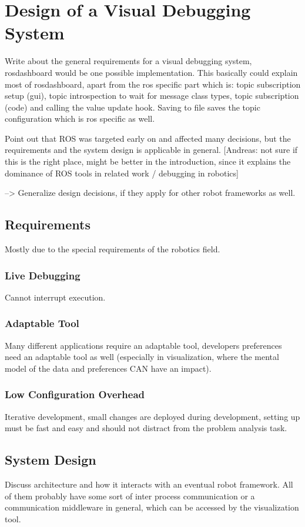 \chapter{Design of a Visual Debugging System}
\label{visual_debugging_system}

Write about the general requirements for a visual debugging system, rosdashboard would be one possible implementation. This basically could explain most of rosdashboard, apart from the ros specific part which is: topic subscription setup (gui), topic introspection to wait for message class types, topic subscription (code) and calling the value update hook. Saving to file saves the topic configuration which is ros specific as well.

Point out that ROS was targeted early on and affected many decisions, but the requirements and the system design is applicable in general. [Andreas: not sure if this is the right place, might be better in the introduction, since it explains the dominance of ROS tools in related work / debugging in robotics]

--> Generalize design decisions, if they apply for other robot frameworks as well.

\section{Requirements}
Mostly due to the special requirements of the robotics field.
\subsection{Live Debugging}
Cannot interrupt execution.
\subsection{Adaptable Tool}
Many different applications require an adaptable tool, developers preferences need an adaptable tool as well (especially in visualization, where the mental model of the data and preferences CAN have an impact).
\subsection{Low Configuration Overhead}
Iterative development, small changes are deployed during development, setting up must be fast and easy and should not distract from the problem analysis task.

\section{System Design}
Discuss architecture and how it interacts with an eventual robot framework. All of them probably have some sort of inter process communication or a communication middleware in general, which can be accessed by the visualization tool.

